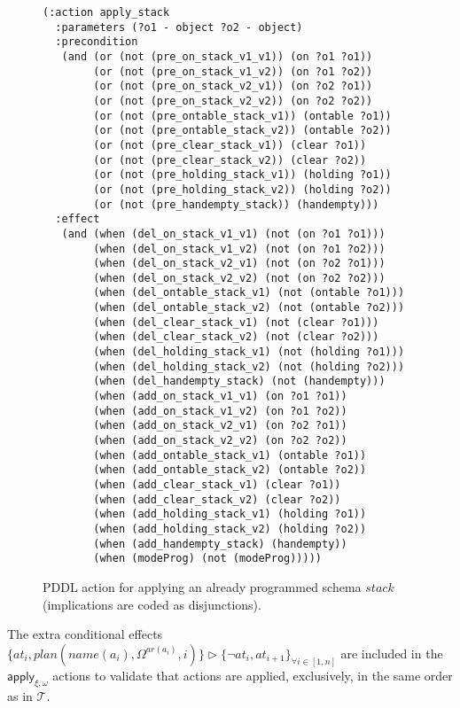 \documentclass[letterpaper]{article} %
\begin{document}
\begin{itemize}
\begin{enumerate}
\begin{figure}[hbt!]
\begin{scriptsize}
\begin{verbatim}
(:action apply_stack
  :parameters (?o1 - object ?o2 - object)
  :precondition
   (and (or (not (pre_on_stack_v1_v1)) (on ?o1 ?o1))
        (or (not (pre_on_stack_v1_v2)) (on ?o1 ?o2))
        (or (not (pre_on_stack_v2_v1)) (on ?o2 ?o1))
        (or (not (pre_on_stack_v2_v2)) (on ?o2 ?o2))
        (or (not (pre_ontable_stack_v1)) (ontable ?o1))
        (or (not (pre_ontable_stack_v2)) (ontable ?o2))
        (or (not (pre_clear_stack_v1)) (clear ?o1))
        (or (not (pre_clear_stack_v2)) (clear ?o2))
        (or (not (pre_holding_stack_v1)) (holding ?o1))
        (or (not (pre_holding_stack_v2)) (holding ?o2))
        (or (not (pre_handempty_stack)) (handempty)))
  :effect
   (and (when (del_on_stack_v1_v1) (not (on ?o1 ?o1)))
        (when (del_on_stack_v1_v2) (not (on ?o1 ?o2)))
        (when (del_on_stack_v2_v1) (not (on ?o2 ?o1)))
        (when (del_on_stack_v2_v2) (not (on ?o2 ?o2)))
        (when (del_ontable_stack_v1) (not (ontable ?o1)))
        (when (del_ontable_stack_v2) (not (ontable ?o2)))
        (when (del_clear_stack_v1) (not (clear ?o1)))
        (when (del_clear_stack_v2) (not (clear ?o2)))
        (when (del_holding_stack_v1) (not (holding ?o1)))
        (when (del_holding_stack_v2) (not (holding ?o2)))
        (when (del_handempty_stack) (not (handempty)))
        (when (add_on_stack_v1_v1) (on ?o1 ?o1))
        (when (add_on_stack_v1_v2) (on ?o1 ?o2))
        (when (add_on_stack_v2_v1) (on ?o2 ?o1))
        (when (add_on_stack_v2_v2) (on ?o2 ?o2))
        (when (add_ontable_stack_v1) (ontable ?o1))
        (when (add_ontable_stack_v2) (ontable ?o2))
        (when (add_clear_stack_v1) (clear ?o1))
        (when (add_clear_stack_v2) (clear ?o2))
        (when (add_holding_stack_v1) (holding ?o1))
        (when (add_holding_stack_v2) (holding ?o2))
        (when (add_handempty_stack) (handempty))
        (when (modeProg) (not (modeProg)))))
\end{verbatim}
\end{scriptsize}
 \caption{\small PDDL action for applying an already programmed schema $stack$ (implications are coded as disjunctions).}
\label{fig:compilation}
\end{figure}
The extra conditional effects $\{at_{i},plan(name(a_i),\Omega^{ar(a_i)},i)\}\rhd\{\neg at_{i},at_{i+1}\}_{\forall i\in [1,n]}$ are included in the $\mathsf{apply_{\xi,\omega}}$ actions to validate that actions are applied, exclusively, in the same order as in $\mathcal{T}$.\\


\end{enumerate}
\end{itemize}
\end{document}

